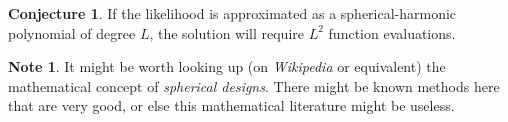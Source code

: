 \documentclass{article}
\theoremstyle{definition}
\newtheorem{conjecture}{Conjecture}[problem]
\newtheorem{note}{Note}[problem]
\theoremstyle{definition}
\begin{document}
\begin{conjecture}
If the likelihood is approximated as a spherical-harmonic polynomial of degree $L$, the solution will require $L^2$ function evaluations.
\end{conjecture}

\begin{note}
It might be worth looking up (on \textit{Wikipedia} or equivalent) the mathematical concept of \emph{spherical designs}.
There might be known methods here that are very good, or else this mathematical literature might be useless.
\end{note}
\end{document}
